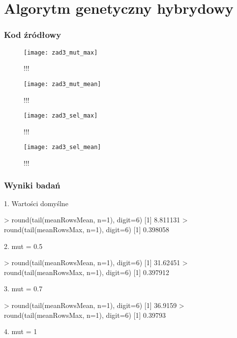 \section{Algorytm genetyczny hybrydowy}

\subsubsection{Kod źródłowy}

\begin{figure}[H]
	\centering
	\hspace*{-0.8in}
	\texttt{[image: zad3\_mut\_max]}
	\caption{!!!}  
	\label{rys:zad3_mut_max} 
\end{figure}

\begin{figure}[H]
	\centering
	\hspace*{-0.8in}
	\texttt{[image: zad3\_mut\_mean]}
	\caption{!!!}  
	\label{rys:zad3_mut_mean} 
\end{figure}

\begin{figure}[H]
	\centering
	\hspace*{-0.8in}
	\texttt{[image: zad3\_sel\_max]}
	\caption{!!!}  
	\label{rys:zad3_sel_max} 
\end{figure}

\begin{figure}[H]
	\centering
	\hspace*{-0.8in}
	\texttt{[image: zad3\_sel\_mean]}
	\caption{!!!}  
	\label{rys:zad3_sel_mean} 
\end{figure}

\subsubsection{Wyniki badań}


1. Wartości domyślne

> round(tail(meanRowsMean, n=1), digit=6)
[1] 8.811131
> round(tail(meanRowsMax, n=1),  digit=6)
[1] 0.398058


2. mut = 0.5

> round(tail(meanRowsMean, n=1), digit=6)
[1] 31.62451
> round(tail(meanRowsMax, n=1),  digit=6)
[1] 0.397912


3. mut = 0.7

> round(tail(meanRowsMean, n=1), digit=6)
[1] 36.9159
> round(tail(meanRowsMax, n=1),  digit=6)
[1] 0.39793


4. mut = 1

